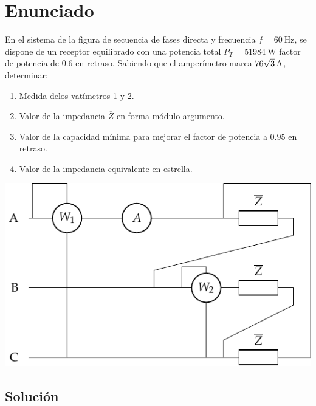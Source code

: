 \section{Enunciado}

\begin{minipage}{0.595\textwidth}
  En el sistema de la figura de secuencia de fases directa y frecuencia
  $f=\qty{60}{\hertz}$, se dispone de un receptor equilibrado con una
  potencia total $P_T=\qty{51984}{\watt}$ factor de potencia de $0.6$ en
  retraso. Sabiendo que el amperímetro marca
  $\qty[parse-numbers=false]{76\sqrt{3}}{\ampere}$, determinar:
  \begin{enumerate}
  \item Medida delos vatímetros 1 y 2.
  \item Valor de la impedancia $\overline{Z}$ en forma módulo-argumento.
  \item Valor de la capacidad mínima para mejorar el factor de potencia
    a $0.95$ en retraso.
  \item Valor de la impedancia equivalente en estrella.
  \end{enumerate}
\end{minipage}
\begin{minipage}{0.395\textwidth}
    \includegraphics[width=\linewidth]{figuras/dosvat_triangulo.pdf}
\end{minipage}


\subsection*{Solución}

